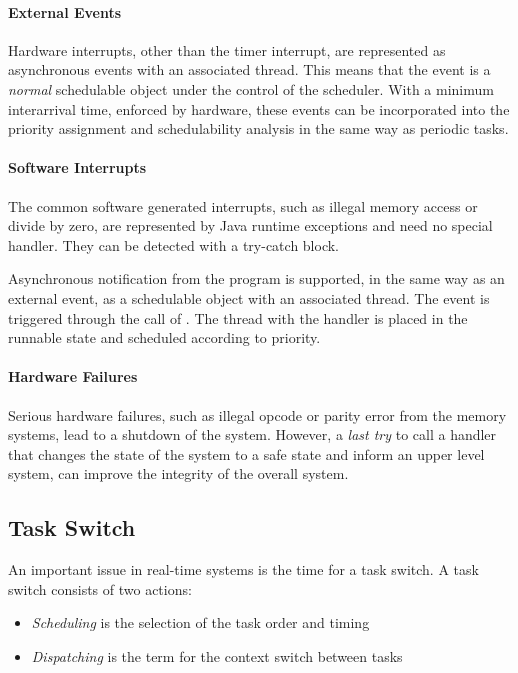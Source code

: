 \paragraph{External Events}

Hardware interrupts, other than the timer interrupt, are represented
as asynchronous events with an associated thread. This means that
the event is a \emph{normal} schedulable object under the control of
the scheduler. With a minimum interarrival time, enforced by
hardware, these events can be incorporated into the priority
assignment and schedulability analysis in the same way as periodic
tasks.

\paragraph{Software Interrupts}

The common software generated interrupts, such as illegal memory
access or divide by zero, are represented by Java runtime exceptions
and need no special handler. They can be detected with a try-catch
block.

Asynchronous notification from the program is supported, in the same
way as an external event, as a schedulable object with an associated
thread. The event is triggered through the call of .
The thread with the handler is placed in the runnable state and
scheduled according to priority.

\paragraph{Hardware Failures}

Serious hardware failures, such as illegal opcode or parity error
from the memory systems, lead to a shutdown of the system. However,
a \emph{last try} to call a handler that changes the state of the
system to a safe state and inform an upper level system, can improve
the integrity of the overall system.

\subsection{Task Switch}

An important issue in real-time systems is the time for a task
switch. A task switch consists of two actions:
\begin{itemize}
    \item \emph{Scheduling} is the selection of the task order and timing
    \item \emph{Dispatching} is the term for the context switch between tasks
\end{itemize}


